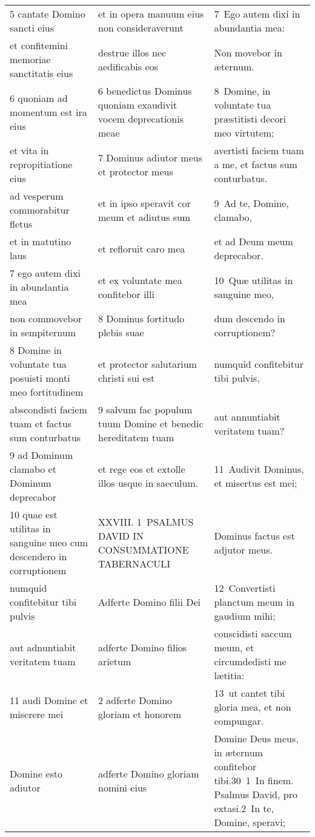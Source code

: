 \documentclass{article}
\begin{document}
\begin{longtable}{@{}p{}p{}p{}@{}}
5 cantate Domino sancti eius	&	et in opera manuum eius non consideraverunt	&	7 Ego autem dixi in abundantia mea:	\\
et confitemini memoriae sanctitatis eius	&	destrue illos nec aedificabis eos	&	Non movebor in æternum.	\\
6 quoniam ad momentum est ira eius	&	6 benedictus Dominus quoniam exaudivit vocem deprecationis meae	&	8 Domine, in voluntate tua præstitisti decori meo virtutem;	\\
et vita in repropitiatione eius	&	7 Dominus adiutor meus et protector meus	&	avertisti faciem tuam a me, et factus sum conturbatus.	\\
ad vesperum commorabitur fletus	&	et in ipso speravit cor meum et adiutus sum	&	9 Ad te, Domine, clamabo,	\\
et in matutino laus	&	et refloruit caro mea	&	et ad Deum meum deprecabor.	\\
7 ego autem dixi in abundantia mea	&	et ex voluntate mea confitebor illi	&	10 Quæ utilitas in sanguine meo,	\\
non commovebor in sempiternum	&	8 Dominus fortitudo plebis suae	&	dum descendo in corruptionem?	\\
8 Domine in voluntate tua posuisti monti meo fortitudinem	&	et protector salutarium christi sui est	&	numquid confitebitur tibi pulvis,	\\
abscondisti faciem tuam et factus sum conturbatus	&	9 salvum fac populum tuum Domine et benedic hereditatem tuam	&	aut annuntiabit veritatem tuam?	\\
9 ad Dominum clamabo et Dominum deprecabor	&	et rege eos et extolle illos usque in saeculum.	&	11 Audivit Dominus, et misertus est mei;	\\
10 quae est utilitas in sanguine meo cum descendero in corruptionem	&	XXVIII. 1 PSALMUS DAVID IN CONSUMMATIONE TABERNACULI	&	Dominus factus est adjutor meus.	\\
numquid confitebitur tibi pulvis	&	Adferte Domino filii Dei	&	12 Convertisti planctum meum in gaudium mihi;	\\
aut adnuntiabit veritatem tuam	&	adferte Domino filios arietum	&	conscidisti saccum meum, et circumdedisti me lætitia:	\\
11 audi Domine et miserere mei	&	2 adferte Domino gloriam et honorem	&	13 ut cantet tibi gloria mea, et non compungar.	\\
Domine esto adiutor	&	adferte Domino gloriam nomini eius	&	Domine Deus meus, in æternum confitebor tibi.30 1 In finem. Psalmus David, pro extasi.2 In te, Domine, speravi;	\\

\end{longtable}
\end{document}
